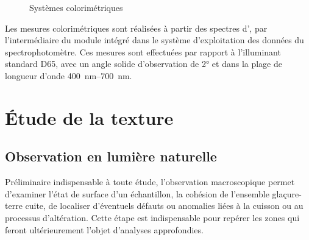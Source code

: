 \begin{figure}[htb]
{\begin{minipage}[b]{0.45\textwidth}
  \end{minipage}%
  }%
  \caption[Systèmes colorimétriques \trichros]
          {Systèmes colorimétriques \trichros 
           \autocite[d'après][]{couleur_2000}}
  \label{fig:colorimetrie}
\end{figure}

Les mesures colorimétriques sont réalisées à partir des spectres 
d'\AO, par l'intermédiaire du module  intégré 
dans le système d'exploitation des données du spectrophotomètre. Ces 
mesures sont effectuées par rapport à l'illuminant standard D65, avec 
un angle solide d'observation de \ang{2} et dans la plage de longueur 
d'onde \SIrange{400}{700}{\nm}.


\section{Étude de la texture}

\subsection{Observation en lumière naturelle}
Préliminaire indispensable à toute étude, l'observation macroscopique 
permet d'examiner l'état de surface d'un échantillon, la cohésion de 
l'ensemble glaçure-terre cuite, de localiser d'éventuels défauts ou 
anomalies liées à la cuisson ou au processus d'altération. Cette étape 
est indispensable pour repérer les zones qui feront ultérieurement 
l'objet d'analyses approfondies.


